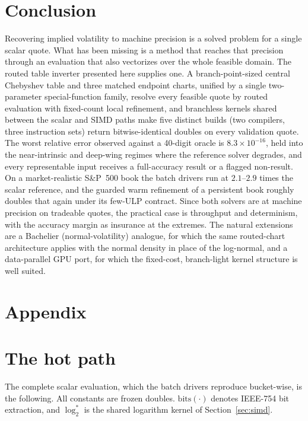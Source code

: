 \documentclass[11pt]{article}
\begin{document}
\section{Conclusion}
\label{sec:conclusion}

Recovering implied volatility to machine precision is a solved problem for a single scalar quote. What has been missing is a method that reaches that precision through an evaluation that also vectorizes over the whole feasible domain. The routed table inverter presented here supplies one. A branch-point-sized central Chebyshev table and three matched endpoint charts, unified by a single two-parameter special-function family, resolve every feasible quote by routed evaluation with fixed-count local refinement, and branchless kernels shared between the scalar and SIMD paths make five distinct builds (two compilers, three instruction sets) return bitwise-identical doubles on every validation quote. The worst relative error observed against a 40-digit oracle is $8.3\times10^{-16}$, held into the near-intrinsic and deep-wing regimes where the reference solver degrades, and every representable input receives a full-accuracy result or a flagged non-result. On a market-realistic S\&P~500 book the batch drivers run at $2.1$--$2.9$ times the scalar reference, and the guarded warm refinement of a persistent book roughly doubles that again under its few-ULP contract. Since both solvers are at machine precision on tradeable quotes, the practical case is throughput and determinism, with the accuracy margin as insurance at the extremes. The natural extensions are a Bachelier (normal-volatility) analogue, for which the same routed-chart architecture applies with the normal density in place of the log-normal, and a data-parallel GPU port, for which the fixed-cost, branch-light kernel structure is well suited.

\newpage



\newpage
\appendix
\section*{Appendix}

\section{The hot path}
\label{app:hotpath}

The complete scalar evaluation, which the batch drivers reproduce bucket-wise, is the following. All constants are frozen doubles. $\mathrm{bits}(\cdot)$ denotes IEEE-754 bit extraction, and $\log_2^{*}$ is the shared logarithm kernel of Section~\ref{sec:simd}.
\end{document}

